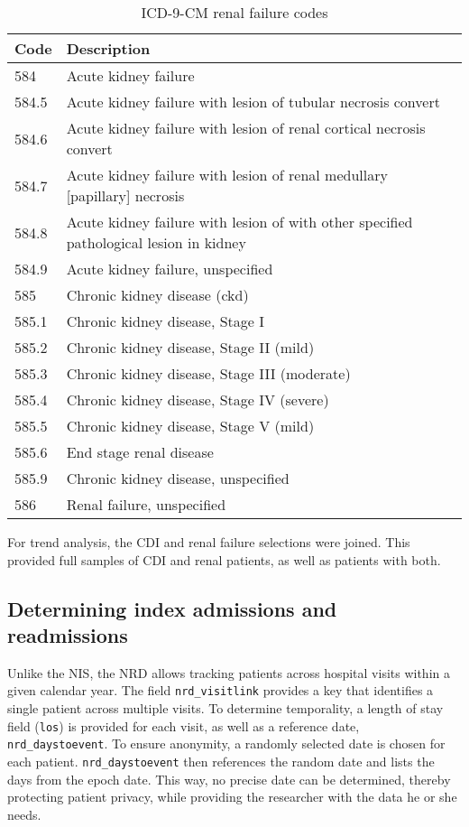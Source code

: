 \begin{table}[]
\centering
\caption{ICD-9-CM renal failure codes}
\label{icd9renal}
\begin{tabular}{ll}
Code  & Description          \\
\hline
584   & Acute kidney failure \\
584.5 &	Acute kidney failure with lesion of tubular necrosis convert \\
584.6 &	Acute kidney failure with lesion of renal cortical necrosis convert \\
584.7 &	Acute kidney failure with lesion of renal medullary [papillary] necrosis \\
584.8 &	Acute kidney failure with lesion of with other specified pathological lesion in kidney \\
584.9 &	Acute kidney failure, unspecified \\
585   & Chronic kidney disease (ckd) \\
585.1 &	Chronic kidney disease, Stage I \\
585.2 &	Chronic kidney disease, Stage II (mild) \\
585.3 &	Chronic kidney disease, Stage III (moderate) \\
585.4 &	Chronic kidney disease, Stage IV (severe) \\
585.5 &	Chronic kidney disease, Stage V (mild) \\
585.6 &	End stage renal disease \\
585.9 &	Chronic kidney disease, unspecified \\
586   &	Renal failure, unspecified \\
\end{tabular}
\end{table}

For trend analysis, the CDI and renal failure selections were joined. This provided full samples of
CDI and renal patients, as well as patients with both.


\subsection{Determining index admissions and readmissions}

Unlike the NIS, the NRD allows tracking patients across hospital visits within a given calendar year.
The field \texttt{nrd\_visitlink} provides a key that identifies a single patient across multiple visits.
To determine temporality, a length of stay field (\texttt{los}) is provided for each visit, as well as
a reference date, \texttt{nrd\_daystoevent}. To ensure anonymity, a randomly selected date is chosen for 
each patient. \texttt{nrd\_daystoevent} then references the random date and lists the days from the epoch date.
This way, no precise date can be determined, thereby protecting patient privacy, while providing the researcher
with the data he or she needs. 

